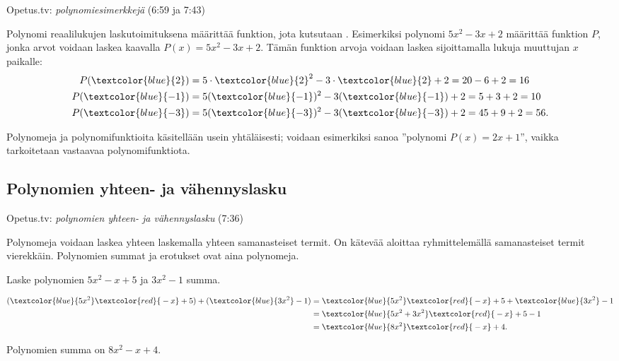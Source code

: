 {Opetus.tv: \emph{polynomiesimerkkejä} (6:59 ja 7:43)}

Polynomi reaalilukujen laskutoimituksena määrittää funktion, jota kutsutaan .
Esimerkiksi polynomi $5x^2-3x+2$ määrittää funktion $P$, jonka arvot voidaan laskea kaavalla $P(x)=5x^2-3x+2$.
Tämän funktion arvoja voidaan laskea sijoittamalla lukuja muuttujan $x$ paikalle:
\begin{align*}
    P(\textcolor{blue}{2}) & = 5\cdot \textcolor{blue}{2}^2-3\cdot \textcolor{blue}{2}+2 = 20 - 6 + 2 = 16 \\
    P(\textcolor{blue}{-1}) & = 5(\textcolor{blue}{-1})^2-3(\textcolor{blue}{-1})+2 = 5 + 3 + 2 = 10 \\
    P(\textcolor{blue}{-3}) & = 5(\textcolor{blue}{-3})^2-3(\textcolor{blue}{-3})+2 = 45 + 9 + 2 = 56.
\end{align*}

Polynomeja ja polynomifunktioita käsitellään usein yhtäläisesti;
voidaan esimerkiksi sanoa ''polynomi $P(x)=2x+1$'',
vaikka tarkoitetaan vastaavaa polynomifunktiota.

\subsection*{Polynomien yhteen- ja vähennyslasku}

{Opetus.tv: \emph{polynomien yhteen- ja vähennyslasku} (7:36)}

Polynomeja voidaan laskea yhteen laskemalla yhteen samanasteiset termit.
On kätevää aloittaa ryhmittelemällä samanasteiset termit vierekkäin. Polynomien summat ja erotukset ovat aina polynomeja.
\newpage 

\begin{esimerkki}
Laske polynomien $5x^2-x+5$ ja $3x^2-1$ summa.
    \begin{esimratk}
        \begin{align*}
            (\textcolor{blue}{5x^2} \textcolor{red}{{}-x} + 5) + (\textcolor{blue}{3x^2} -1) 
            &=\textcolor{blue}{5x^2} \textcolor{red}{{}-x} + 5 + \textcolor{blue}{3x^2} -1 \\
            &=\textcolor{blue}{5x^2+3x^2} \textcolor{red}{{}-x} +5-1\\
            &=\textcolor{blue}{8x^2} \textcolor{red}{{}-x}+4.
        \end{align*}
    \end{esimratk}
    \begin{esimvast}
        Polynomien summa on $8x^2-x+4$.
    \end{esimvast}
\end{esimerkki}


